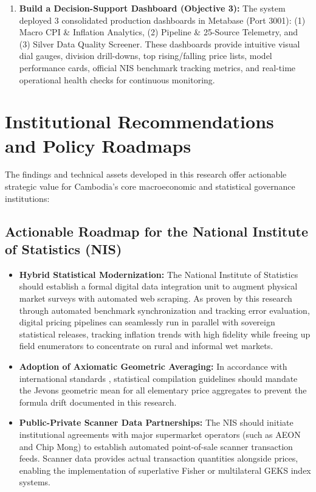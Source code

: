 \begin{enumerate}
    \item \textbf{Build a Decision-Support Dashboard (Objective 3):} The system deployed 3 consolidated production dashboards in Metabase (Port 3001): (1) Macro CPI \& Inflation Analytics, (2) Pipeline \& 25-Source Telemetry, and (3) Silver Data Quality Screener. These dashboards provide intuitive visual dial gauges, division drill-downs, top rising/falling price lists, model performance cards, official NIS benchmark tracking metrics, and real-time operational health checks for continuous monitoring.
\end{enumerate}

\section{Institutional Recommendations and Policy Roadmaps}
\hs The findings and technical assets developed in this research offer actionable strategic value for Cambodia's core macroeconomic and statistical governance institutions:

\subsection{Actionable Roadmap for the National Institute of Statistics (NIS)}
\begin{itemize}
    \item \textbf{Hybrid Statistical Modernization:} The National Institute of Statistics should establish a formal digital data integration unit to augment physical market surveys with automated web scraping. As proven by this research through automated benchmark synchronization and tracking error evaluation, digital pricing pipelines can seamlessly run in parallel with sovereign statistical releases, tracking inflation trends with high fidelity while freeing up field enumerators to concentrate on rural and informal wet markets.
    \item \textbf{Adoption of Axiomatic Geometric Averaging:} In accordance with international standards \citep{imf2020cpi}, statistical compilation guidelines should mandate the Jevons geometric mean for all elementary price aggregates to prevent the formula drift documented in this research.
    \item \textbf{Public-Private Scanner Data Partnerships:} The NIS should initiate institutional agreements with major supermarket operators (such as AEON and Chip Mong) to establish automated point-of-sale scanner transaction feeds. Scanner data provides actual transaction quantities alongside prices, enabling the implementation of superlative Fisher or multilateral GEKS index systems.
\end{itemize}


